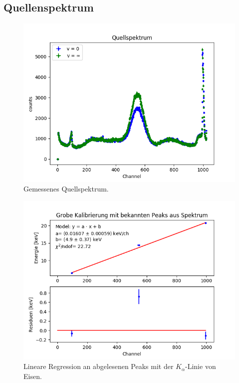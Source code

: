 \documentclass[12pt,a4paper]{article}
\begin{document}
\subsection{Quellenspektrum}
\begin{figure} [H]
\centering
\includegraphics[scale=0.8]{Bilder/Quellspektrum/v0_und_vinf.png}
\caption{Gemessenes Quellspektrum.}
\end{figure}

\begin{figure} [H]
\centering
\includegraphics[scale=0.8]{Bilder/Quellspektrum/Kalibrierung_alpha.png}
\caption{Lineare Regression an abgelesenen Peaks mit der $K_{\alpha}$-Linie von Eisen.}
\end{figure}
\end{document}
